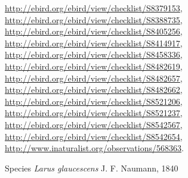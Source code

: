 \documentclass[9pt, article]{memoir}
\begin{document}
\begin{multicols}{2}
\url{http://ebird.org/ebird/view/checklist/S8379153}, 
\url{http://ebird.org/ebird/view/checklist/S8388735}, 
\url{http://ebird.org/ebird/view/checklist/S8405256}, 
\url{http://ebird.org/ebird/view/checklist/S8414917}, 
\url{http://ebird.org/ebird/view/checklist/S8458336}, 
\url{http://ebird.org/ebird/view/checklist/S8482619}, 
\url{http://ebird.org/ebird/view/checklist/S8482657}, 
\url{http://ebird.org/ebird/view/checklist/S8482662}, 
\url{http://ebird.org/ebird/view/checklist/S8521206}, 
\url{http://ebird.org/ebird/view/checklist/S8521237}, 
\url{http://ebird.org/ebird/view/checklist/S8542567}, 
\url{http://ebird.org/ebird/view/checklist/S8542654}, 
\url{http://www.inaturalist.org/observations/568363}.

\vspace{6pt}\noindent\hspace{36pt}Species \textit{Larus glaucescens} J. F. Naumann, 1840



\end{multicols}
\end{document}
